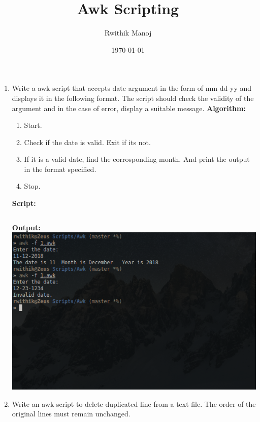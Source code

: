\documentclass[10pt,a4paper,titlepage]{report}
\begin{document}
\begin{titlepage}
\author{Rwithik Manoj}
\title{Awk Scripting}
\date{\today}
\maketitle
\end{titlepage}

\begin{enumerate}
	\item Write a awk script that accepts date argument in the form of mm-dd-yy and displays it in the following format. The script should check the validity of the argument and in the case of error, display a suitable message.\newline
	\textbf{Algorithm:}\newline
	\begin{enumerate}
			\item Start.
			\item Check if the date is valid. Exit if its not. 
			\item If it is a valid date, find the corrosponding month. And print the output in the format specified.
			\item Stop.
	\end{enumerate}
	\textbf{Script:}\newline
	\inputminted[tabsize=4]{awk}{../Scripts/Awk/1.awk}
	\textbf{Output:}\newline\newline
	\includegraphics[width=\linewidth]{../Images/Awk/1.png}
	\item Write an awk script to delete duplicated line from a text file. The order of the original lines must remain unchanged.\newline

\end{enumerate}
\end{document}
